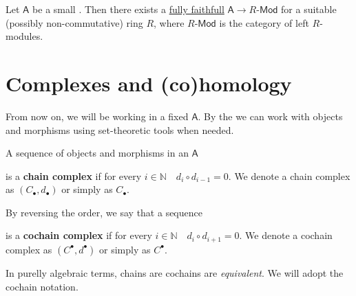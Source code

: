 \documentclass[../main.tex]{subfiles}
\begin{document}
\begin{theorem} \label{thm:freyd-mitchell}
  Let \(\mathsf{A}\) be a small . Then there exists a \hyperref[def:functor-types]{fully faithfull}  \(\mathsf{A} \to R\text{-}\mathsf{Mod}\) for a suitable (possibly non-commutative) ring \(R\), where \(R\text{-}\mathsf{Mod}\) is the category of left \(R\)-modules.
\end{theorem}


\section{Complexes and (co)homology}

From now on, we will be working in a fixed  \(\mathsf{A}\).
By the  we can work with objects and morphisms using set-theoretic tools when needed.

\begin{definition}[Complex] \label{def:complex}
  A sequence of objects and morphisms in an  \(\mathsf{A}\)
  \begin{center}
  \end{center}
  is a \textbf{chain complex} if for every \(i \in \mathbb{N} \quad d_{i} \circ d_{i-1} = 0\).
  We denote a chain complex as \((C_{\bullet}, d_{\bullet})\) or simply as \(C_{\bullet}\).

  By reversing the order, we say that a sequence
  \begin{center}
  \end{center}
  is a \textbf{cochain complex} if for every \(i \in \mathbb{N} \quad d_{i} \circ d_{i+1} = 0\).
  We denote a cochain complex as \((C^{\bullet}, d^{\bullet})\) or simply as \(C^{\bullet}\).
\end{definition}

\begin{remark}
  In purelly algebraic terms, chains are cochains are \textit{equivalent}.
  We will adopt the cochain notation.
\end{remark}
\end{document}
